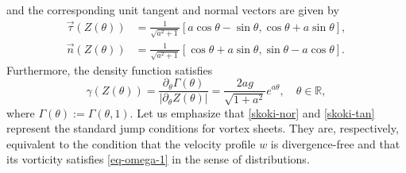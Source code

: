 \documentclass[11pt, letterpaper, reqno]{amsart}
\numberwithin{equation}{section}
\theoremstyle{definition}
\theoremstyle{plain}
\numberwithin{equation}{section}
\def\R{\mathbb{R}}
\begin{document}
and the corresponding unit tangent and normal vectors are given by
\begin{align}\label{tan-form}
\vec{\tau}(Z(\theta)) & = \frac{1}{\sqrt{a^2+1}} [a \cos \theta - \sin \theta, \cos \theta + a \sin \theta], \\ \label{norm-form}
\vec{n}(Z(\theta)) & = \frac{1}{\sqrt{a^2+1}} [\cos \theta + a \sin \theta, \sin \theta - a \cos \theta].
\end{align}
Furthermore, the density function satisfies
\begin{equation}\label{gestosc}
\gamma(Z(\theta))=\frac{\partial_\theta \Gamma(\theta)}{|\partial_\theta Z(\theta)|} =
\frac{2ag}{\sqrt{1+a^{2}}} e^{a\theta}, \quad \theta\in\R,
\end{equation}
where $\Gamma(\theta) := \Gamma(\theta, 1)$. Let us emphasize that \eqref{skoki-nor} and \eqref{skoki-tan} represent the standard jump conditions for vortex sheets. They are, respectively, equivalent to the condition that the velocity profile $w$ is divergence-free and that its vorticity satisfies \eqref{eq-omega-1} in the sense of distributions. 
\end{document}
